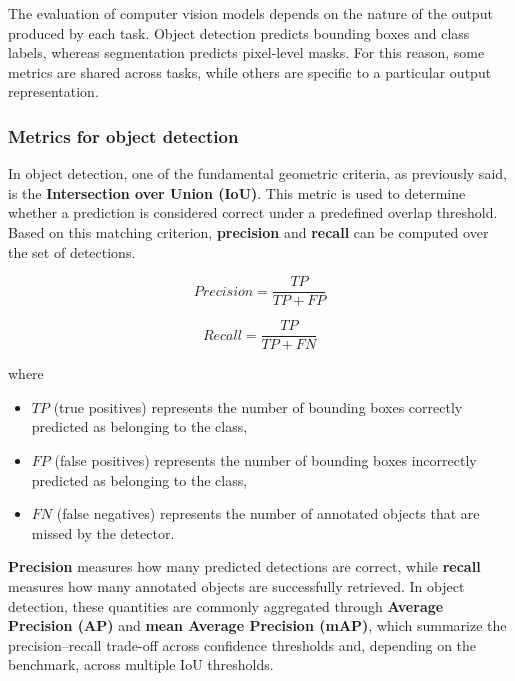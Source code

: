 
The evaluation of computer vision models depends on the nature of the output produced by each task. Object detection predicts bounding boxes and class labels, whereas segmentation predicts pixel-level masks.\cite{ibm_what_2024,ibm_what_2023} For this reason, some metrics are shared across tasks, while others are specific to a particular output representation.

\subsubsection{Metrics for object detection}
In object detection, one of the fundamental geometric criteria, as previously said, is the \textbf{Intersection over Union (IoU)}.
This metric is used to determine whether a prediction is considered correct under a predefined overlap threshold. Based on this matching criterion, \textbf{precision} and \textbf{recall} can be computed over the set of detections.\cite{sklearn_precision_recall_2026,detectron2_coco_evaluation_2020}

\begin{equation}
Precision = \frac{TP}{TP + FP}
\end{equation}

\begin{equation}
Recall = \frac{TP}{TP + FN}
\end{equation}

where
\begin{itemize}
    \item $TP$ (true positives) represents the number of bounding boxes correctly predicted as belonging to the class,
    \item $FP$ (false positives) represents the number of bounding boxes incorrectly predicted as belonging to the class,
    \item $FN$ (false negatives) represents the number of annotated objects that are missed by the detector.
\end{itemize}

\textbf{Precision} measures how many predicted detections are correct, while \textbf{recall} measures how many annotated objects are successfully retrieved. In object detection, these quantities are commonly aggregated through \textbf{Average Precision (AP)} and \textbf{mean Average Precision (mAP)}, which summarize the precision--recall trade-off across confidence thresholds and, depending on the benchmark, across multiple IoU thresholds.\cite{detectron2_coco_evaluation_2020}

